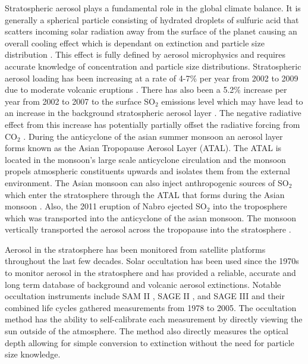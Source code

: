 \documentclass[12pt]{article}
\begin{document}
Stratospheric aerosol plays a fundamental role in the global climate balance. It is generally a spherical particle consisting of hydrated droplets of sulfuric acid that scatters 
incoming solar radiation away from the surface of the planet causing an overall cooling effect which is dependant on extinction and particle size distribution \citep{Kiehl1993}. 
This effect is fully defined by aerosol microphysics and requires accurate knowledge of concentration and particle size distributions. Stratospheric aerosol loading has been 
increasing at a rate of 4-7\% per year from 2002 to 2009 due to moderate volcanic eruptions \citep{Vernier2011}. There has also been a 5.2\% increase per year from 2002 to 2007 
to the surface SO$_{2}$ emissions level which may have lead to an increase in the background stratospheric aerosol layer \citep{Hofmann2009}. The negative radiative effect from 
this increase has potentially partially offset the radiative forcing from CO$_{2}$ \citep{Solomon2011}. During the anticyclone of the asian summer monsoon an aerosol layer forms 
known as the Asian Tropopause Aerosol Layer (ATAL). The ATAL is located in the monsoon's large scale anticyclone circulation and the monsoon propels atmospheric constituents 
upwards and isolates them from the external environment. The Asian monsoon can also inject anthropogenic sources of SO$_{2}$ which enter the stratosphere through the ATAL that 
forms during the Asian monsoon \citep{Vernier2011, Neely2014}. Also, the 2011 eruption of Nabro ejected  SO$_{2}$ into the troposphere which was transported into the anticyclone 
of the asian monsoon. The monsoon vertically transported the aerosol across the tropopause into the stratosphere \citep{Bourassa2012c}.

Aerosol in the stratosphere has been monitored from satellite platforms throughout the last few decades. Solar occultation has been used since the 1970s to monitor aerosol in 
the stratosphere and has provided a reliable, accurate and long term database of background and volcanic aerosol extinctions. Notable occultation instruments include SAM II 
\citep{McCormick1979}, SAGE II \citep{McCormick1987}, and SAGE III \citep{Thomason2003} and their combined life cycles gathered measurements from 1978 to 2005. The occultation 
method has the ability to self-calibrate each measurement by directly viewing the sun outside of the atmosphere. The method also directly measures the optical depth allowing for 
simple conversion to extinction without the need for particle size knowledge.
\end{document}
